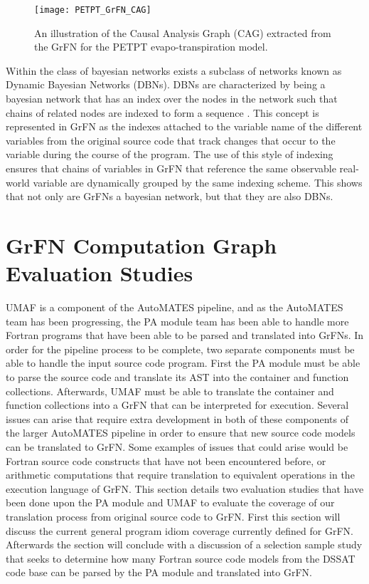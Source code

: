 \begin{figure}[!tbp]
  \centering
  \texttt{[image: PETPT\_GrFN\_CAG]}
  \caption[PETPT GrFN Causal Analysis Graph]{An illustration of the Causal Analysis Graph (CAG) extracted from the GrFN for the PETPT evapo-transpiration model.}
  \label{fig:petpt_cag}
\end{figure}

Within the class of bayesian networks exists a subclass of networks known as Dynamic Bayesian Networks (DBNs).
DBNs are characterized by being a bayesian network that has an index over the nodes in the network such that chains of related nodes are indexed to form a sequence \citep{pearl2009causality}.
This concept is represented in GrFN as the indexes attached to the variable name of the different variables from the original source code that track changes that occur to the variable during the course of the program.
The use of this style of indexing ensures that chains of variables in GrFN that reference the same observable real-world variable are dynamically grouped by the same indexing scheme.
This shows that not only are GrFNs a bayesian network, but that they are also DBNs.

\section{GrFN Computation Graph Evaluation Studies\label{sec:grfn_eval}}
UMAF is a component of the AutoMATES pipeline, and as the AutoMATES team has been progressing, the PA module team has been able to handle more Fortran programs that have been able to be parsed and translated into GrFNs.
In order for the pipeline process to be complete, two separate components must be able to handle the input source code program.
First the PA module must be able to parse the source code and translate its AST into the container and function collections.
Afterwards, UMAF must be able to translate the container and function collections into a GrFN that can be interpreted for execution.
Several issues can arise that require extra development in both of these components of the larger AutoMATES pipeline in order to ensure that new source code models can be translated to GrFN.
Some examples of issues that could arise would be Fortran source code constructs that have not been encountered before, or arithmetic computations that require translation to equivalent operations in the execution language of GrFN.
This section details two evaluation studies that have been done upon the PA module and UMAF to evaluate the coverage of our translation process from original source code to GrFN.
First this section will discuss the current general program idiom coverage currently defined for GrFN.
Afterwards the section will conclude with a discussion of a selection sample study that seeks to determine how many Fortran source code models from the DSSAT code base can be parsed by the PA module and translated into GrFN.

